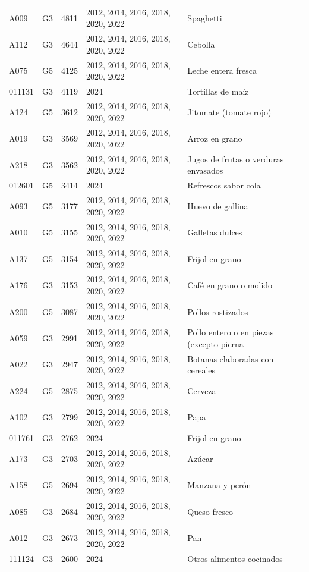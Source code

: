 \begin{table}[ht]
\begin{tabular}{llrll}
  A009 & G3 & 4811 & 2012, 2014, 2016, 2018, 2020, 2022 & Spaghetti \\ 
  A112 & G3 & 4644 & 2012, 2014, 2016, 2018, 2020, 2022 & Cebolla \\ 
  A075 & G5 & 4125 & 2012, 2014, 2016, 2018, 2020, 2022 & Leche entera fresca \\ 
  011131 & G3 & 4119 & 2024 & Tortillas de maíz \\ 
  A124 & G5 & 3612 & 2012, 2014, 2016, 2018, 2020, 2022 & Jitomate (tomate rojo) \\ 
  A019 & G3 & 3569 & 2012, 2014, 2016, 2018, 2020, 2022 & Arroz en grano \\ 
  A218 & G3 & 3562 & 2012, 2014, 2016, 2018, 2020, 2022 & Jugos de frutas o verduras envasados \\ 
  012601 & G5 & 3414 & 2024 & Refrescos sabor cola \\ 
  A093 & G5 & 3177 & 2012, 2014, 2016, 2018, 2020, 2022 & Huevo de gallina \\ 
  A010 & G5 & 3155 & 2012, 2014, 2016, 2018, 2020, 2022 & Galletas dulces \\ 
  A137 & G5 & 3154 & 2012, 2014, 2016, 2018, 2020, 2022 & Frijol en grano \\ 
  A176 & G3 & 3153 & 2012, 2014, 2016, 2018, 2020, 2022 & Café en grano o molido \\ 
  A200 & G5 & 3087 & 2012, 2014, 2016, 2018, 2020, 2022 & Pollos rostizados \\ 
  A059 & G3 & 2991 & 2012, 2014, 2016, 2018, 2020, 2022 & Pollo entero o en piezas (excepto pierna \\ 
  A022 & G3 & 2947 & 2012, 2014, 2016, 2018, 2020, 2022 & Botanas elaboradas con cereales \\ 
  A224 & G5 & 2875 & 2012, 2014, 2016, 2018, 2020, 2022 & Cerveza \\ 
  A102 & G3 & 2799 & 2012, 2014, 2016, 2018, 2020, 2022 & Papa \\ 
  011761 & G3 & 2762 & 2024 & Frijol en grano \\ 
  A173 & G3 & 2703 & 2012, 2014, 2016, 2018, 2020, 2022 & Azúcar \\ 
  A158 & G5 & 2694 & 2012, 2014, 2016, 2018, 2020, 2022 & Manzana y perón \\ 
  A085 & G3 & 2684 & 2012, 2014, 2016, 2018, 2020, 2022 & Queso fresco \\ 
  A012 & G3 & 2673 & 2012, 2014, 2016, 2018, 2020, 2022 & Pan \\ 
  111124 & G3 & 2600 & 2024 & Otros alimentos cocinados \\ 

\end{tabular}
\end{table}
